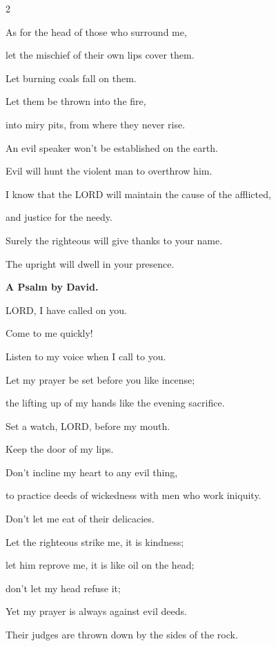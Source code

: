 \begin{multicols}{2}
	
	\vspace{\baselineskip}
	
	
	
	\myverse{}As for the head of those who surround me,
	
	let the mischief of their own lips cover them.
	
	
	\myverse{}Let burning coals fall on them.
	
	Let them be thrown into the fire,
	
	into miry pits, from where they never rise.
	
	
	\myverse{}An evil speaker won’t be established on the earth.
	
	Evil will hunt the violent man to overthrow him.
	
	
	\myverse{}I know that the LORD will maintain the cause of the afflicted,
	
	and justice for the needy.
	
	
	\myverse{}Surely the righteous will give thanks to your name.
	
	The upright will dwell in your presence.
	
	
	\mychapter{}\textbf{A Psalm by David.}
	
	\quad\quad\quad \myverse*{}LORD, I have called on you.
	
   Come to me quickly!
	
	Listen to my voice when I call to you.
	
	
	\myverse{}Let my prayer be set before you like incense;
	
	the lifting up of my hands like the evening sacrifice.
	
	
	\myverse{}Set a watch, LORD, before my mouth.
	
	Keep the door of my lips.
	
	
	\myverse{}Don’t incline my heart to any evil thing,
	
	to practice deeds of wickedness with men who work iniquity.
	
	Don’t let me eat of their delicacies.
	
	
	\myverse{}Let the righteous strike me, it is kindness;
	
	let him reprove me, it is like oil on the head;
	
	don’t let my head refuse it;
	
	Yet my prayer is always against evil deeds.
	
	
	\myverse{}Their judges are thrown down by the sides of the rock.
	

\end{multicols}
